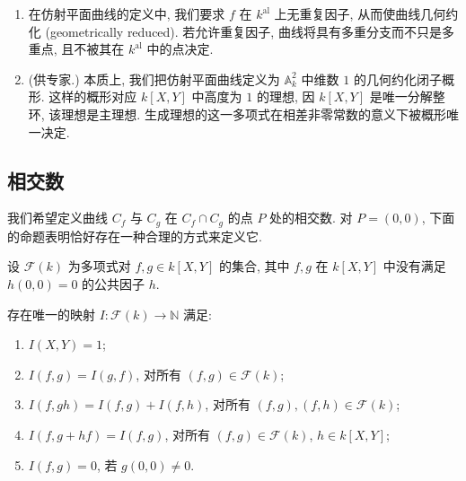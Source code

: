 \begin{aside} \label{thm:1.1.7} 
\begin{enumerate}[label=\textup{(\alph*)}]
\item 在仿射平面曲线的定义中, 我们要求 $f$ 在 $k^{\mathrm{al}}$ 上无重复因子, 从而使曲线几何约化 (geometrically reduced). 若允许重复因子, 曲线将具有多重分支而不只是多重点, 且不被其在 $k^{\mathrm{al}}$ 中的点决定.
\item (供专家.) 本质上, 我们把仿射平面曲线定义为 $\mathbb{A}^2_k$ 中维数 $1$ 的几何约化闭子概形. 这样的概形对应 $k[X,Y]$ 中高度为 $1$ 的理想, 因 $k[X,Y]$ 是唯一分解整环, 该理想是主理想. 生成理想的这一多项式在相差非零常数的意义下被概形唯一决定.
\end{enumerate}
\end{aside}

\subsection*{相交数}

我们希望定义曲线 $C_f$ 与 $C_g$ 在 $C_f\cap C_g$ 的点 $P$ 处的相交数. 对 $P = (0,0)$, 下面的命题表明恰好存在一种合理的方式来定义它.

设 $\mathcal{F}(k)$ 为多项式对 $f,g\in k[X,Y]$ 的集合, 其中 $f,g$ 在 $k[X,Y]$ 中没有满足 $h(0,0) = 0$ 的公共因子 $h$.

\begin{proposition} \label{thm:1.1.8} 
存在唯一的映射 $I\colon\mathcal{F}(k)\to\mathbb{N}$ 满足:
\begin{enumerate}[label=\textup{(\alph*)}]
\item $I(X,Y) = 1$;
\item $I(f,g) = I(g,f)$, 对所有 $(f,g)\in\mathcal{F}(k)$;
\item $I(f,gh) = I(f,g) + I(f,h)$, 对所有 $(f,g),(f,h)\in\mathcal{F}(k)$;
\item $I(f, g + hf) = I(f,g)$, 对所有 $(f,g)\in\mathcal{F}(k)$, $h\in k[X,Y]$;
\item $I(f,g) = 0$, 若 $g(0,0)\neq 0$.
\end{enumerate}
\end{proposition}

